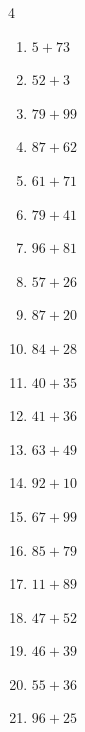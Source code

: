 \begin{multicols}{4}
\begin{enumerate}
  \item $5+73$
        \phantom{$=78$}

  \item $52+3$
        \phantom{$=55$}

  \item $79+99$
        \phantom{$=178$}

  \item $87+62$
        \phantom{$=149$}

  \item $61+71$
        \phantom{$=132$}

  \item $79+41$
        \phantom{$=120$}

  \item $96+81$
        \phantom{$=177$}

  \item $57+26$
        \phantom{$=83$}

  \item $87+20$
        \phantom{$=107$}

  \item $84+28$
        \phantom{$=112$}

  \item $40+35$
        \phantom{$=75$}

  \item $41+36$
        \phantom{$=77$}

  \item $63+49$
        \phantom{$=112$}

  \item $92+10$
        \phantom{$=102$}

  \item $67+99$
        \phantom{$=166$}

  \item $85+79$
        \phantom{$=164$}

  \item $11+89$
        \phantom{$=100$}

  \item $47+52$
        \phantom{$=99$}

  \item $46+39$
        \phantom{$=85$}

\columnbreak %

  \item $55+36$
        \phantom{$=91$}

  \item $96+25$
        \phantom{$=121$}


\end{enumerate}
\end{multicols}
